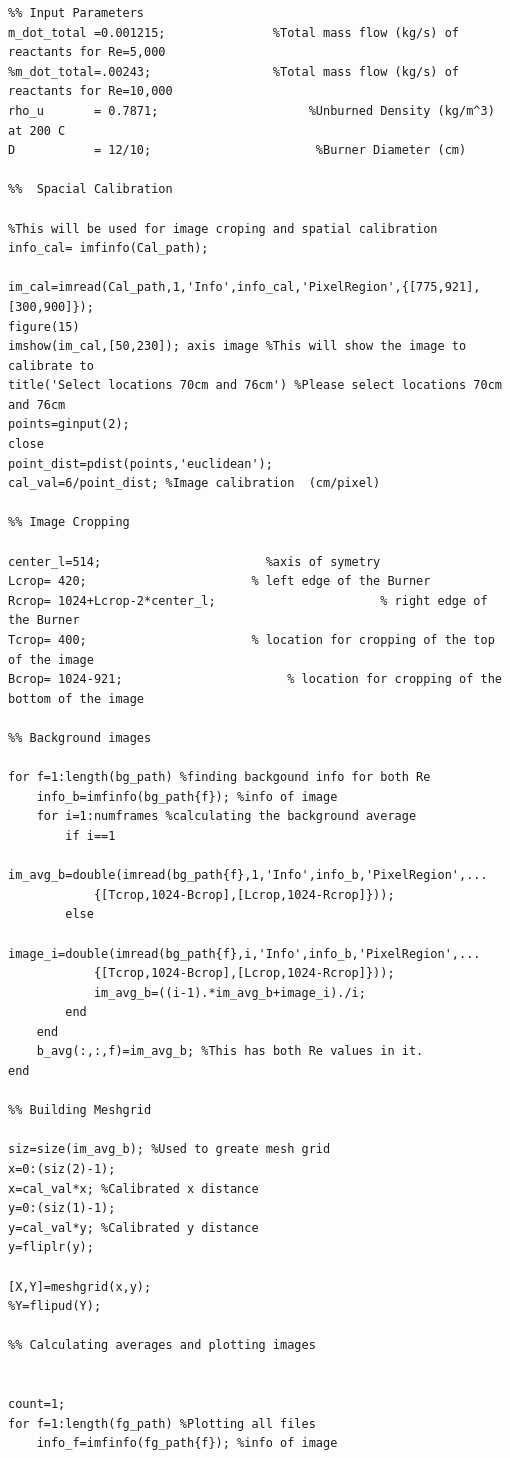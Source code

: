 \documentclass[12pt]{ussci} %
\begin{document}
\begin{appendices}
\begin{verbatim}
%% Input Parameters
m_dot_total =0.001215;               %Total mass flow (kg/s) of reactants for Re=5,000
%m_dot_total=.00243;                 %Total mass flow (kg/s) of reactants for Re=10,000
rho_u       = 0.7871;                     %Unburned Density (kg/m^3) at 200 C
D           = 12/10;                       %Burner Diameter (cm)

%%  Spacial Calibration

%This will be used for image croping and spatial calibration
info_cal= imfinfo(Cal_path);

im_cal=imread(Cal_path,1,'Info',info_cal,'PixelRegion',{[775,921],[300,900]});
figure(15)
imshow(im_cal,[50,230]); axis image %This will show the image to calibrate to
title('Select locations 70cm and 76cm') %Please select locations 70cm and 76cm
points=ginput(2);
close
point_dist=pdist(points,'euclidean');
cal_val=6/point_dist; %Image calibration  (cm/pixel)

%% Image Cropping

center_l=514;                       %axis of symetry
Lcrop= 420;                       % left edge of the Burner
Rcrop= 1024+Lcrop-2*center_l;                       % right edge of the Burner
Tcrop= 400;                       % location for cropping of the top of the image
Bcrop= 1024-921;                       % location for cropping of the bottom of the image

%% Background images

for f=1:length(bg_path) %finding backgound info for both Re
    info_b=imfinfo(bg_path{f}); %info of image
    for i=1:numframes %calculating the background average
        if i==1
            im_avg_b=double(imread(bg_path{f},1,'Info',info_b,'PixelRegion',...
            {[Tcrop,1024-Bcrop],[Lcrop,1024-Rcrop]}));
        else
            image_i=double(imread(bg_path{f},i,'Info',info_b,'PixelRegion',...
            {[Tcrop,1024-Bcrop],[Lcrop,1024-Rcrop]}));
            im_avg_b=((i-1).*im_avg_b+image_i)./i;
        end
    end
    b_avg(:,:,f)=im_avg_b; %This has both Re values in it.
end

%% Building Meshgrid 

siz=size(im_avg_b); %Used to greate mesh grid
x=0:(siz(2)-1); 
x=cal_val*x; %Calibrated x distance
y=0:(siz(1)-1); 
y=cal_val*y; %Calibrated y distance
y=fliplr(y);

[X,Y]=meshgrid(x,y);
%Y=flipud(Y);

%% Calculating averages and plotting images


count=1;
for f=1:length(fg_path) %Plotting all files
    info_f=imfinfo(fg_path{f}); %info of image



\end{verbatim}
\end{appendices}
\end{document}
